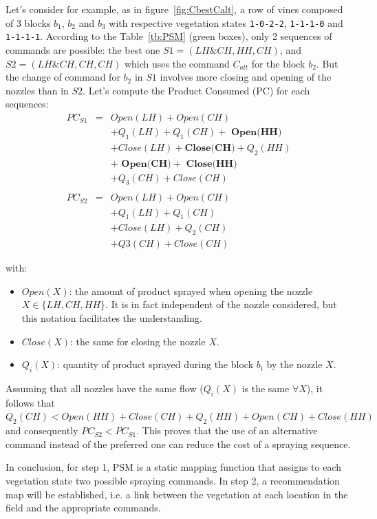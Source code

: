 \documentclass[preprint,3p,times,twocolumn]{elsarticle}
\begin{document}
Let's consider for example, as in figure~\ref{fig:CbestCalt}, a row of vines composed of 3 blocks $ b_1 $, $ b_2 $ and $ b_3 $ with respective vegetation states \texttt{1-0-2-2}, \texttt{1-1-1-0} and \texttt{1-1-1-1}. According to the Table~\ref{tb:PSM} (green boxes), only 2 sequences of commands are possible: the best one $ S1= (LH \& CH, HH, CH) $, and $ S2=(LH \& CH, CH, CH)$ which uses the command $C_{alt}$ for the block $b_2$. 
But the change of command for $ b_2 $ in $S1$ involves more closing and opening of the nozzles than in $ S2 $. Let's compute the Product Consumed (PC) for each sequences:
\begin{eqnarray*}
PC_{S1} & = & Open(LH) + Open(CH) \\
&   & + Q_1(LH) + Q_1(CH) +\textbf{ Open(HH)} \\
&   & + Close(LH) + \textbf{Close(CH)} +  Q_2(HH) \\
&   &+\textbf{ Open(CH)} + \textbf{ Close(HH)}\\
&   & + Q_3(CH) + Close(CH) \\
& & \\
PC_{S2} & = & Open(LH) + Open(CH) \\
&   & + Q_1(LH) + Q_1(CH) \\
&   & + Close(LH) +  Q_2(CH) \\
&   & + Q3(CH) + Close(CH)
\end{eqnarray*}

with:
\begin{itemize}
\item $ Open (X) $: the amount of product sprayed when opening the nozzle $ X \in \{LH,CH,HH\}$. It is in fact independent of the nozzle considered, but this notation facilitates the understanding. 
\item $ Close (X) $: the same for closing the nozzle $ X $.
\item $ Q_i (X) $: quantity of product sprayed during the block $ b_i $ by the nozzle $ X $.
\end{itemize}
Assuming that all nozzles have the same flow ($Q_i(X)$ is the same $ \forall X$), it follows that $ Q_2(CH) < Open(HH) + Close(CH) + Q_2(HH) + Open(CH) + Close(HH) $ and consequently $PC_{S2}<PC_{S1}$. This proves that the use of an alternative command instead of the preferred one can reduce the cost of a spraying sequence.

In conclusion, for step 1, PSM is a static mapping function that assigns to each vegetation state two possible spraying commands. In step 2, a recommendation map will be established, i.e. a link between the vegetation at each location in the field and the appropriate commands.
\end{document}
